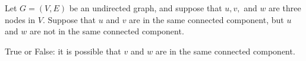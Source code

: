 \begin{prob}
    Let $G = (V, E)$ be an undirected graph, and suppose that $u, v, $ and $w$
    are three nodes in $V$. Suppose that $u$ and $v$ are in the same connected component,
    but $u$ and $w$ are not in the same connected component. 
    
    True or False: it
    is possible that $v$ and $w$ are in the same connected component.

    \tF{}
\end{prob}